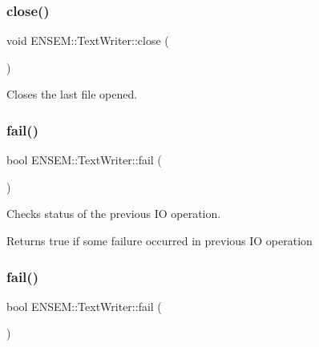 \mbox{\label{classENSEM_1_1TextWriter_a8b65ccb4936fe8b05492e4f30983b7ee}} 
\subsubsection{\texorpdfstring{close()}{close()}\hspace{0.1cm}{\footnotesize\ttfamily [3/3]}}
{\footnotesize\ttfamily void E\+N\+S\+E\+M\+::\+Text\+Writer\+::close (\begin{DoxyParamCaption}{ }\end{DoxyParamCaption})}



Closes the last file opened. 

\mbox{\label{classENSEM_1_1TextWriter_a924bbfa5f3bd8f1dbb3f856b1db8b9be}} 
\subsubsection{\texorpdfstring{fail()}{fail()}\hspace{0.1cm}{\footnotesize\ttfamily [1/3]}}
{\footnotesize\ttfamily bool E\+N\+S\+E\+M\+::\+Text\+Writer\+::fail (\begin{DoxyParamCaption}{ }\end{DoxyParamCaption})}



Checks status of the previous IO operation. 

\begin{DoxyReturn}{Returns}
true if some failure occurred in previous IO operation 
\end{DoxyReturn}
\mbox{\label{classENSEM_1_1TextWriter_a924bbfa5f3bd8f1dbb3f856b1db8b9be}} 
\subsubsection{\texorpdfstring{fail()}{fail()}\hspace{0.1cm}{\footnotesize\ttfamily [2/3]}}
{\footnotesize\ttfamily bool E\+N\+S\+E\+M\+::\+Text\+Writer\+::fail (\begin{DoxyParamCaption}{ }\end{DoxyParamCaption})}



